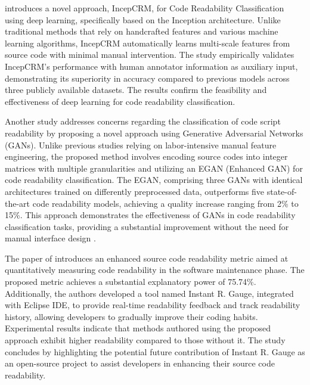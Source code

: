 \documentclass[%
class=scrreprt,
chapterprefix=false,%
open=right,%
twoside=false,%
paper=a4,%
logofile={Logo\_zentral\_farbig\_EN.png},%
thesistype=master,%
UKenglish,%
]{se2thesis}
\begin{document}
	\citeauthor{mi2018inception} introduces a novel approach, IncepCRM, for Code Readability Classification using deep learning, specifically based on the Inception architecture. Unlike traditional methods that rely on handcrafted features and various machine learning algorithms, IncepCRM automatically learns multi-scale features from source code with minimal manual intervention. The study empirically validates IncepCRM's performance with human annotator information as auxiliary input, demonstrating its superiority in accuracy compared to previous models across three publicly available datasets. The results confirm the feasibility and effectiveness of deep learning for code readability classification.
	
	Another study addresses concerns regarding the classification of code script readability by proposing a novel approach using Generative Adversarial Networks (GANs). Unlike previous studies relying on labor-intensive manual feature engineering, the proposed method involves encoding source codes into integer matrices with multiple granularities and utilizing an EGAN (Enhanced GAN) for code readability classification. The EGAN, comprising three GANs with identical architectures trained on differently preprocessed data, outperforms five state-of-the-art code readability models, achieving a quality increase ranging from 2\% to 15\%. This approach demonstrates the effectiveness of GANs in code readability classification tasks, providing a substantial improvement without the need for manual interface design \cite{sharma2020egan}.
	
	The paper of \citeauthor{choi2020metric} introduces an enhanced source code readability metric aimed at quantitatively measuring code readability in the software maintenance phase. The proposed metric achieves a substantial explanatory power of 75.74\%. Additionally, the authors developed a tool named Instant R. Gauge, integrated with Eclipse IDE, to provide real-time readability feedback and track readability history, allowing developers to gradually improve their coding habits. Experimental results indicate that methods authored using the proposed approach exhibit higher readability compared to those without it. The study concludes by highlighting the potential future contribution of Instant R. Gauge as an open-source project to assist developers in enhancing their source code readability.
	
\end{document}
